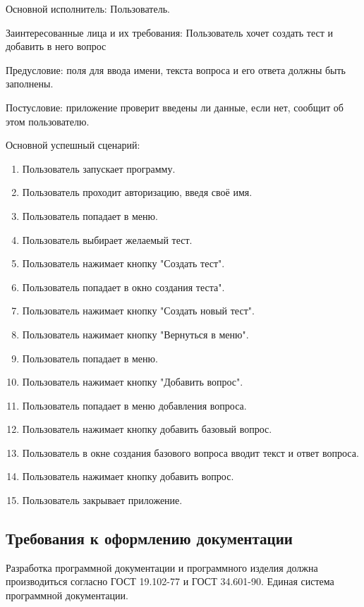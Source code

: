 Основной исполнитель: Пользователь.

Заинтересованные лица и их требования: Пользователь хочет создать тест и добавить в него вопрос

Предусловие: поля для ввода имени, текста вопроса и его ответа должны быть заполнены.

Постусловие: приложение проверит введены ли данные, если нет, сообщит об этом пользователю.

Основной успешный сценарий:
\begin{enumerate}
	\item Пользователь запускает программу.
	\item Пользователь проходит авторизацию, введя своё имя.
	\item Пользователь попадает в меню.
	\item Пользователь выбирает желаемый тест.
	\item Пользователь нажимает кнопку "Создать тест".
	\item Пользователь попадает в окно создания теста".
	\item Пользователь нажимает кнопку "Создать новый тест".
	\item Пользователь нажимает кнопку "Вернуться в меню".
	\item Пользователь попадает в меню.
	\item Пользователь нажимает кнопку "Добавить вопрос".
	\item Пользователь попадает в меню добавления вопроса.
	\item Пользователь нажимает кнопку добавить базовый вопрос.
	\item Пользователь в окне создания базового вопроса вводит текст и ответ вопроса.
	\item Пользователь нажимает кнопку добавить вопрос.
	\item Пользователь закрывает приложение.
\end{enumerate}

\subsection{Требования к оформлению документации}

Разработка программной документации и программного изделия должна производиться согласно ГОСТ 19.102-77 и ГОСТ 34.601-90. Единая система программной документации.
